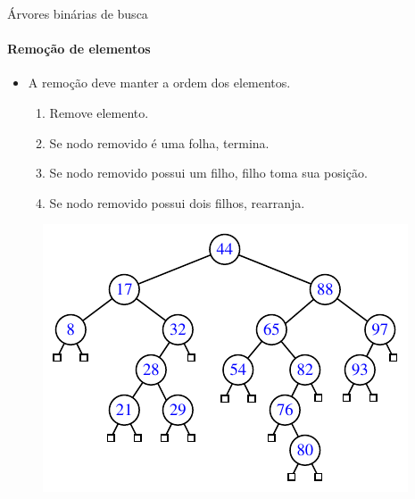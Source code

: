 \begin{frame}{Árvores binárias de busca}
\framesubtitle{Remoção de elementos}
\begin{itemize}
	\item A remoção deve manter a ordem dos elementos.
	\begin{enumerate}
		\item Remove elemento.
		\item Se nodo removido é uma folha, termina.
		\item Se nodo removido possui um filho, filho toma sua posição.
		\item Se nodo removido possui dois filhos, rearranja.
	\end{enumerate}
\end{itemize}

\begin{figure}
	\centering
	\includegraphics[width=0.55\linewidth]{img/figure-11-1}
\end{figure}

\end{frame}



